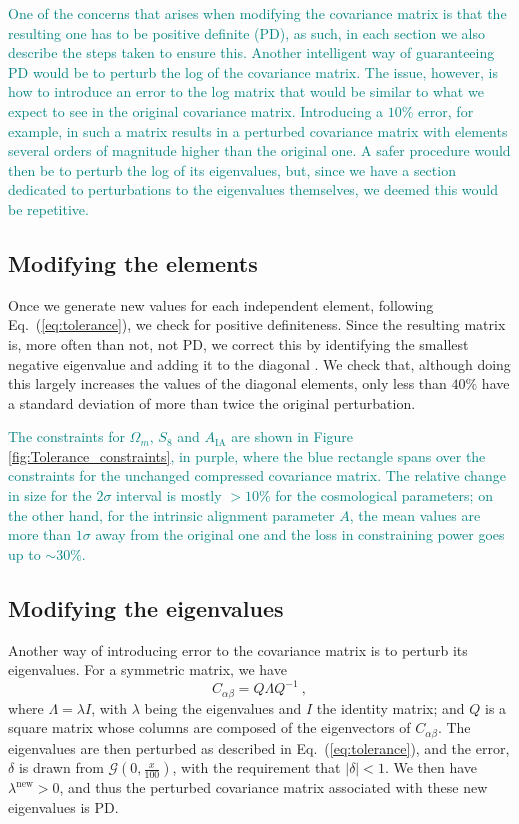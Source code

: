 \documentclass[twocolumn]{\docclass}
\newcommand{\rf}[1]{Figure \ref{fig:#1}}
\newcommand{\ec}[1]{Eq.~(\ref{eq:#1})}
\newcommand\be{\begin{equation}}
\newcommand\ee{\end{equation}}
\begin{document}
	\textcolor{teal}{One of the concerns that arises when modifying the covariance matrix is that the resulting one has to be positive definite (PD), as such, in each section we also describe the steps taken to ensure this. Another intelligent way of guaranteeing PD would be to perturb the log of the covariance matrix. The issue, however, is how to introduce an error to the log matrix that would be similar to what we expect to see in the original covariance matrix. Introducing a $10\%$ error, for example, in such a matrix results in a perturbed covariance matrix with elements several orders of magnitude higher than the original one. A safer procedure would then be to perturb the log of its eigenvalues, but, since we have a section dedicated to perturbations to the eigenvalues themselves, we deemed this would be repetitive.}
	
	\subsection{Modifying the elements}
	
	Once we generate new values for each independent element, following \ec{tolerance}, we check for positive definiteness. Since the resulting matrix is, more often than not, not PD, we correct this by identifying the smallest negative eigenvalue and adding it to the diagonal \cite{Yuan:2008}. We check that, although doing this largely increases the values of the diagonal elements, only less than $40 \%$ have a standard deviation of more than twice the original perturbation. 
	
	\textcolor{teal}{The constraints for $\Omega_m$, $S_8$ and $A_{\mathrm{IA}}$ are shown in \rf{Tolerance_constraints}, in purple, where the blue rectangle spans over the constraints for the unchanged compressed covariance matrix. The relative change in size for the $2\sigma$ interval is mostly $> 10 \%$ for the cosmological parameters; on the other hand, for the intrinsic alignment parameter $A$, the mean values are more than $1\sigma$ away from the original one and the loss in constraining power goes up to $\sim 30 \%$.}
	
	\subsection{Modifying the eigenvalues}
	
	Another way of introducing error to the covariance matrix is to perturb its eigenvalues. For a symmetric matrix, we have
	\be
	C_{\alpha \beta} = Q\Lambda Q^{-1}\ 
	,\ee
	where $\Lambda = \lambda I$, with $\lambda$ being the eigenvalues and $I$ the identity matrix; and $Q$ is a square matrix whose columns are composed of the eigenvectors of $C_{\alpha \beta}$. The eigenvalues are then perturbed as described in \ec{tolerance}, and the error, $\delta$ is drawn from $\mathcal{G}(0,\frac{x}{100})$, with the requirement that $|\delta| < 1$. We then have $\lambda^{\mathrm{new}} > 0$, and thus the perturbed covariance matrix associated with these new eigenvalues is PD. 
	
\end{document}
